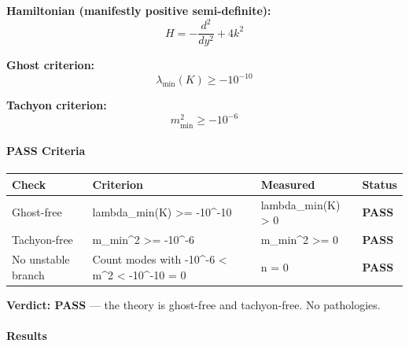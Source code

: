 \documentclass[
  11pt,
]{article}
\begin{document}
\textbf{Hamiltonian (manifestly positive semi-definite):}
\[H = -\frac{d^2}{dy^2} + 4k^2 \tag{123}\]

\textbf{Ghost criterion:}
\[\lambda_\text{min}(K) \geq -10^{-10} \tag{124}\]

\textbf{Tachyon criterion:} \[m_\text{min}^2 \geq -10^{-6} \tag{125}\]

\bigskip

\hypertarget{pass-criteria-4}{%
\paragraph{PASS Criteria}\label{pass-criteria-4}}

\begin{longtable}[]{@{}llll@{}}
\toprule
Check & Criterion & Measured & Status\tabularnewline
\midrule
\endhead
Ghost-free & lambda\_min(K) \textgreater= -10\^{}-10 & lambda\_min(K)
\textgreater{} 0 & \textbf{PASS}\tabularnewline
Tachyon-free & m\_min\^{}2 \textgreater= -10\^{}-6 & m\_min\^{}2
\textgreater= 0 & \textbf{PASS}\tabularnewline
No unstable branch & Count modes with -10\^{}-6 \textless{} m\^{}2
\textless{} -10\^{}-10 = 0 & n = 0 & \textbf{PASS}\tabularnewline
\bottomrule
\end{longtable}

\textbf{Verdict: PASS} --- the theory is ghost-free and tachyon-free. No
pathologies.

\bigskip

\hypertarget{results-4}{%
\paragraph{Results}\label{results-4}}
\end{document}
